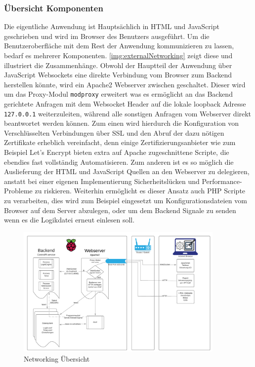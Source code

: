 \subsubsection{Übersicht Komponenten}
Die eigentliche Anwendung ist Hauptsächlich in HTML und JavaScript geschrieben und wird im Browser des Benutzers ausgeführt. Um die Benutzeroberfläche mit dem Rest der Anwendung kommunizieren zu lassen, bedarf es mehrerer Komponenten. \autoref{img:externalNetworking} zeigt diese und illustriert die Zusammenhänge. Obwohl der Hauptteil der Anwendung über JavaScript Websockets eine direkte Verbindung vom Browser zum Backend herstellen könnte, wird ein Apache2 Webserver zwischen geschaltet. Dieser wird um das Proxy-Modul \texttt{modproxy} erweitert was es ermöglicht an das Backend gerichtete Anfragen mit dem Websocket Header auf die lokale loopback Adresse \texttt{127.0.0.1} weiterzuleiten, während alle sonstigen Anfragen vom Webserver direkt beantwortet werden können. Zum einen wird hierdurch die Konfiguration von Verschlüsselten Verbindungen über SSL und den Abruf der dazu nötigen Zertifikate erheblich vereinfacht, denn einige Zertifizierungsanbieter wie zum Beispiel Let's Encrypt \cite{URL:LetsEncrypt} bieten extra auf Apache zugeschnittene Scripte, die ebendies fast vollständig Automatisieren. Zum anderen ist es so möglich die Auslieferung der HTML und JavaScript Quellen an den Webserver zu delegieren, anstatt bei einer eigenen Implementierung Sicherheitslücken und Performance-Probleme zu riskieren. Weiterhin ermöglicht es dieser Ansatz auch PHP Scripte zu verarbeiten, dies wird zum Beispiel eingesetzt um Konfigurationsdateien vom Browser auf dem Server abzulegen, oder um dem Backend Signale zu senden wenn es die Logikdatei erneut einlesen soll.

\begin{figure}[H]
	\begin{center}
		\includegraphics[width=0.9\textwidth ,clip]{./images/BackendFrontend.pdf}
		\caption{Networking Übersicht}
		\label{img:externalNetworking}
	\end{center} 
\end{figure}

